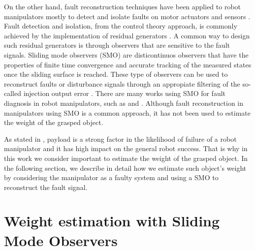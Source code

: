 \documentclass[smallextended]{svjour3}       %
\begin{document}
On the other hand, fault reconstruction techniques have been applied to robot manipulators mostly to detect and isolate faults on motor actuators and sensors \cite{omali2019nonlinear,cordoneanu2018review,zhang2020review}. Fault detection and isolation, from the control theory approach, is commonly achieved by the implementation of residual generators \cite{abid2020review}. A common way to design such residual generators is through observers that are sensitive to the fault signals. Sliding mode observers (SMO) are disticontinuos observers that have the properties of finite time convergence and accurate tracking of the measured states once the sliding surface is reached. These type of observers can be used to reconstruct faults or disturbance signals through an appropiate filtering of the so-called injection output error \cite{shtessel2014sliding,davila2006observation}. There are many works using SMO for fault diagnosis in robot manipulators, such as \cite{capisani2012manipulator,sun2017protective} and \cite{ferrara2020sliding}. Although fault reconstruction in manipulators using SMO is a common approach, it has not been used to estimate the weight of the grasped object.

As stated in \cite{steinbauer2012survey}, payload is a strong factor in the likelihood of failure of a robot manipulator and it has high impact on the general robot success. That is why in this work we consider important to estimate the weight of the grasped object. In the following section, we describe in detail how we estimate such object's weight by considering the manipulator as a faulty system and using a SMO to reconstruct the fault signal.

\section{Weight estimation with Sliding Mode Observers}
\label{sec:System}
\end{document}
